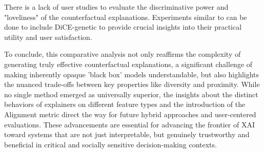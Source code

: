 There is a lack of user studies to evaluate the discriminative power and "loveliness" of the counterfactual explanations. Experiments similar to \citet{forrest2021contrastive} can be done to include DiCE-genetic to provide crucial insights into their practical utility and user satisfaction.


To conclude, this comparative analysis not only reaffirms the complexity of generating truly effective counterfactual explanations, a significant challenge of making inherently opaque 'black box' models understandable, but also highlights the nuanced trade-offs between key properties like diversity and proximity. While no single method emerged as universally superior, the insights about the distinct behaviors of explainers on different feature types and the introduction of the Alignment metric direct the way for future hybrid approaches and user-centered evaluations. These advancements are essential for advancing the frontier of XAI toward systems that are not just interpretable, but genuinely trustworthy and beneficial in critical and socially sensitive decision-making contexts.
